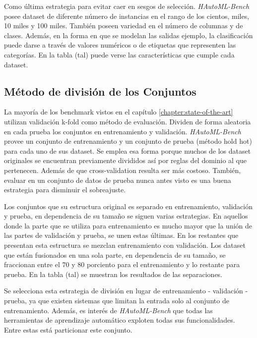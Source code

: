 Como última estrategia para evitar caer en sesgos de selección. \textit{HAutoML-Bench} posee dataset de diferente número de instancias en el rango de los cientos, 
miles, 10 miles y 100 miles. También poseen variedad en el número de columnas y de clases. Además, en la forma en que se modelan las salidas ejemplo, la clasificación 
puede darse a través de valores numéricos o de etiquetas que representen las categorías. 
En la tabla (tal) puede verse las características que cumple cada dataset.

\subsection{Método de división de los Conjuntos}\label{subsection:division}

La mayoría de los benchmark vistos en el capítulo \ref{chapter:state-of-the-art} utilizan validación k-fold como método de evaluación. Dividen de forma 
aleatoria en cada prueba los conjuntos en entrenamiento y validación. \textit{HAutoML-Bench} provee un conjunto de entrenamiento y un conjunto de prueba 
(método hold hot) para cada uno de sus dataset. Se emplea esa forma porque muchos de los dataset originales se encuentran previamente divididos así por reglas 
del dominio al que pertenecen. Además de que cross-validation resulta ser más costoso. También, evaluar en un conjunto de datos de prueba nunca antes visto es una buena 
estrategia para disminuir el sobreajuste.  

Los conjuntos que su estructura original es separado en entrenamiento, validación y prueba, en dependencia de su tamaño se siguen varias estrategias. 
En aquellos donde la parte que se utiliza para entrenamiento es mucho mayor que la unión de las partes de validación y prueba, se unen estas últimas.
En los restantes que presentan esta estructura se mezclan entrenamiento con validación. Los dataset que están fusionados en una sola parte, en dependencia 
de su tamaño, se fraccionan entre el 70 y 80 porciento para el entrenamiento y lo restante para prueba. En la tabla (tal) se muestran los resultados de 
las separaciones. 

Se selecciona esta estrategia de división en lugar de entrenamiento - validación - prueba, ya que existen sistemas que limitan la entrada solo al conjunto de 
entrenamiento. Además, es interés de \textit{HAutoML-Bench} que todas las herramientas de aprendizaje automático exploten todas sus funcionalidades. 
Entre estas está particionar este conjunto.

